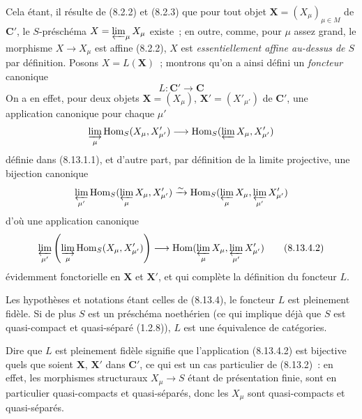 \begin{env}[8.13.4]
Cela étant, il résulte de (8.2.2) et (8.2.3) que pour tout objet
$\mathbf X=(X_\mu)_{\mu\in M}$ de $\boldsymbol{C}'$, le $S$-préschéma
$X=\varprojlim_\mu X_\mu$ existe~; en outre, comme, pour $\mu$ assez grand,
le morphisme $X\to X_\mu$ est affine (8.2.2), $X$ est
\emph{essentiellement affine au-dessus de $S$} par définition. Posons
$X=L(\mathbf X)$~; montrons qu'on a ainsi défini un \emph{foncteur} canonique
\begin{equation}
\label{IV.8.13.4.1-fr}
L:\boldsymbol{C}'\longrightarrow\boldsymbol{C} \tag{8.13.4.1}
\end{equation}
On a en effet, pour deux objets $\mathbf X=(X_\mu)$,
$\mathbf X'=(X'_{\mu'})$ de $\boldsymbol{C}'$, une application canonique pour
chaque $\mu'$
\[
\varinjlim_\mu\operatorname{Hom}_S(X_\mu,X'_{\mu'})
\longrightarrow
\operatorname{Hom}_S(\varprojlim X_\mu,X'_{\mu'})
\]
définie dans (8.13.1.1), et d'autre part, par définition de la limite
projective, une bijection canonique
\[
\varprojlim_{\mu'}
\operatorname{Hom}_S(\varprojlim_\mu X_\mu,X'_{\mu'})
\xrightarrow{\sim}
\operatorname{Hom}_S(\varprojlim_\mu X_\mu,
\varprojlim_{\mu'}X'_{\mu'})
\]
d'où une application canonique
\begin{equation}
\label{IV.8.13.4.2-fr}
\varprojlim_{\mu'}\left(\varinjlim_\mu
\operatorname{Hom}_S(X_\mu,X'_{\mu'})\right)
\longrightarrow
\operatorname{Hom}(\varprojlim_\mu X_\mu,
\varprojlim_{\mu'}X'_{\mu'}) \tag{8.13.4.2}
\end{equation}
évidemment fonctorielle en $\mathbf X$ et $\mathbf X'$, et qui complète la
définition du foncteur $L$.
\end{env}

\begin{proposition}[8.13.5]
\label{IV.8.13.5-fr}
Les hypothèses et notations étant celles de \textup{(8.13.4)}, le foncteur $L$ est
pleinement fidèle. Si de plus $S$ est un préschéma noethérien \textup{(ce qui implique
déjà que $S$ est quasi-compact et quasi-séparé (1.2.8))}, $L$ est une
équivalence de catégories.
\end{proposition}

Dire que $L$ est pleinement fidèle signifie que l'application (8.13.4.2) est
bijective quels que soient $\mathbf X$, $\mathbf X'$ dans $\boldsymbol{C}'$, ce
qui est un cas particulier de (8.13.2)~: en effet, les morphismes structuraux
$X_\mu\to S$ étant de présentation finie, sont en particulier quasi-compacts
et quasi-séparés, donc les $X_\mu$ sont quasi-compacts et quasi-séparés.

